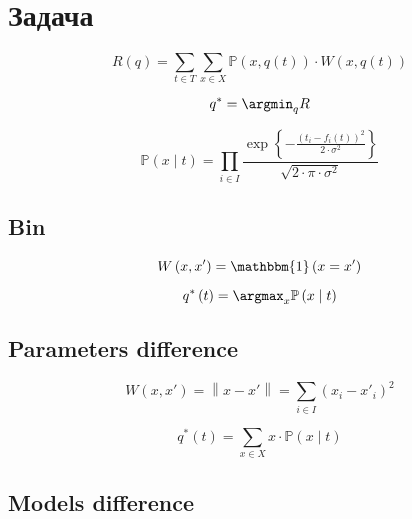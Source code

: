\section{Задача}

\begin{equation*}
  R \left( q \right)
  = \sum\limits_{t \in T} \sum\limits_{x \in X}
    \mathbb{P} \left( x,  q\left( t \right) \right)
    \cdot W \left( x, q\left( t \right) \right)
\end{equation*}

\begin{equation*}
  q^* = \argmin_q R
\end{equation*}

\begin{equation*}
  \mathbb{P}\left( x \mid t \right)
  = \prod_{i \in I}
    \frac{\exp{\left\{- \frac{\left( t_i - f_i\left( t \right) \right)^2}
           {2 \cdot \sigma^2} \right\}}}
         {\sqrt{2 \cdot \pi \cdot \sigma^2}}
\end{equation*}

\subsection{Bin}

\begin{equation*}
  W \left( x, x' \right)
  = \mathbbm{1} \left( x = x' \right)
\end{equation*}

\begin{equation*}
  q^* \left( t \right)
  = \argmax_x \mathbb{P} \left( x \mid  t \right)
\end{equation*}

\subsection{Parameters difference}

\begin{equation*}
  W \left( x, x' \right)
  = \left\| x - x' \right\|
  = \sum_{i \in I} \left( x_i - x'_i \right)^2
\end{equation*}

\begin{equation*}
  q^* \left( t \right)
  = \sum_{x \in X} x \cdot \mathbb{P}\left( x \mid t \right)
\end{equation*}

\subsection{Models difference}

